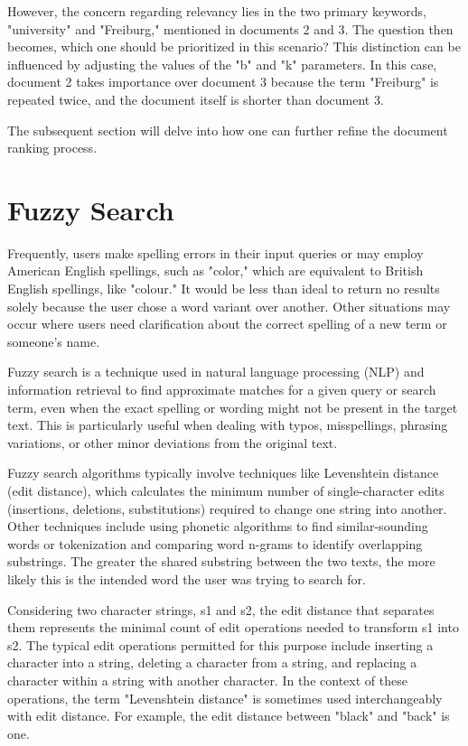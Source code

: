 However, the concern regarding relevancy lies in the two primary keywords, "university" and "Freiburg," mentioned in documents 2 and 3. The question then becomes, which one should be prioritized in this scenario? This distinction can be influenced by adjusting the values of the "b" and "k" parameters. In this case, document 2 takes importance over document 3 because the term "Freiburg" is repeated twice, and the document itself is shorter than document 3.

The subsequent section will delve into how one can further refine the document ranking process.


\section{Fuzzy Search}
Frequently, users make spelling errors in their input queries or may employ American English spellings, such as "color," which are equivalent to British English spellings, like "colour." It would be less than ideal to return no results solely because the user chose a word variant over another. Other situations may occur where users need clarification about the correct spelling of a new term or someone's name.

Fuzzy search is a technique used in natural language processing (NLP) and information retrieval to find approximate matches for a given query or search term, even when the exact spelling or wording might not be present in the target text. This is particularly useful when dealing with typos, misspellings, phrasing variations, or other minor deviations from the original text.

Fuzzy search algorithms typically involve techniques like Levenshtein distance (edit distance), which calculates the minimum number of single-character edits (insertions, deletions, substitutions) required to change one string into another. Other techniques include using phonetic algorithms to find similar-sounding words or tokenization and comparing word n-grams to identify overlapping substrings. The greater the shared substring between the two texts, the more likely this is the intended word the user was trying to search for.


Considering two character strings, s1 and s2, the edit distance that separates them represents the minimal count of edit operations needed to transform s1 into s2. The typical edit operations permitted for this purpose include inserting a character into a string, deleting a character from a string, and replacing a character within a string with another character. In the context of these operations, the term "Levenshtein distance" is sometimes used interchangeably with edit distance. For example, the edit distance between "black" and "back" is one.


